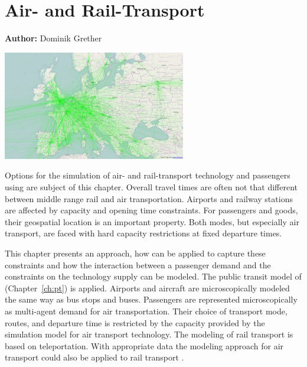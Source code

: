\chapter{Air- and Rail-Transport}
\label{ch:air}

\hfill \textbf{Author:} Dominik Grether

\begin{center} \includegraphics[width=0.6\textwidth, angle=0]{extending/figures/air/air_network_europe_osm} \end{center}


Options for the simulation of air- and rail-transport technology and passengers using  are subject of this chapter. 
Overall travel times are often not that different between middle range rail and air transportation. 
Airports and railway stations are affected by capacity and opening time constraints. 
For passengers and goods, their geospatial location is an important property. 
Both modes, but especially air transport, are faced with hard capacity restrictions at fixed departure times. 

This chapter presents an approach, how  can be applied to capture these constraints and how the interaction between a passenger demand and the constraints on the technology supply can be modeled. 
The public transit model of  (Chapter~\ref{ch:pt}) is applied. %
Airports and aircraft are microscopically modeled the same way as bus stops and buses. 
Passengers are represented microscopically as multi-agent demand for air transportation. 
Their choice of transport mode, routes, and departure time is restricted by the capacity provided by the simulation model for air transport technology. 
The modeling of rail transport is based on teleportation. 
With appropriate data the modeling approach for air transport could also be applied to rail transport \citep{Quick2012BARailTraffic}.  

